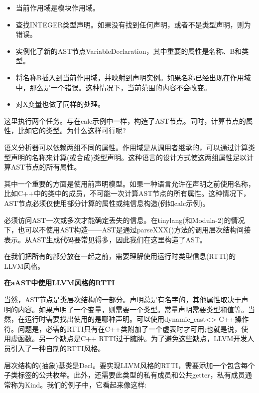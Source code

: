 \begin{itemize}
	\item 当前作用域是模块作用域。
	\item 查找INTEGER类型声明。如果没有找到任何声明，或者不是类型声明，则为错误。
	\item 实例化了新的AST节点VariableDeclaration，其中重要的属性是名称、B和类型。
	\item 将名称B插入到当前作用域，并映射到声明实例。如果名称已经出现在作用域中，那么是一个错误。这种情况下，当前范围的内容不会改变。
	\item 对X变量也做了同样的处理。
\end{itemize}

这里执行两个任务。与在calc示例中一样，构造了AST节点。同时，计算节点的属性，比如它的类型。为什么这样可行呢?\par

语义分析器可以依赖两组不同的属性。作用域是从调用者继承的，可以通过计算类型声明的名称来计算(或合成)类型声明。这种语言的设计方式使这两组属性足以计算AST节点的所有属性。\par

其中一个重要的方面是使用前声明模型。如果一种语言允许在声明之前使用名称，比如C++中的类中的成员，不可能一次计算AST节点的所有属性。这种情况下，AST节点必须仅使用部分计算的属性或纯信息构造(例如calc示例)。\par

必须访问AST一次或多次才能确定丢失的信息。在tinylang(和Modula-2)的情况下，也可以不使用AST构造——AST是通过parseXXX()方法的调用层次结构间接表示。从AST生成代码要常见得多，因此我们在这里构造了AST。\par

在我们把所有的部分放在一起之前，需要理解使用运行时类型信息(RTTI)的LLVM风格。\par

\hspace*{\fill} \par %
\textbf{在aAST中使用LLVM风格的RTTI}

当然，AST节点是类层次结构的一部分。声明总是有名字的，其他属性取决于声明的内容。如果声明了一个变量，则需要一个类型。常量声明需要类型和值等。当然，在运行时需要找出使用的是哪种声明。可以使用dynamic\underline{~}cast<> C++操作符。问题是，必需的RTTI只有在C++类附加了一个虚表时才可用;也就是说，使用虚函数。另一个缺点是C++ RTTI过于臃肿。为了避免这些缺点，LLVM开发人员引入了一种自制的RTTI风格。\par

层次结构的(抽象)基类是Decl。要实现LLVM风格的RTTI，需要添加一个包含每个子类标签的公共枚举。此外，还需要此类型的私有成员和公共getter，私有成员通常称为Kind。我们的例子中，它看起来像这样:\par

